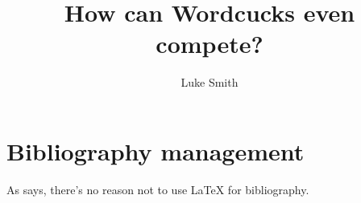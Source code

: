 \documentclass{article}
\author{Luke Smith}
\title{How can Wordcucks even compete?}
\begin{document}
\maketitle

\section{Bibliography management}

As \textcite{test} says, there's no reason not to use \LaTeX{} for bibliography.

\printbibliography
\end{document}
